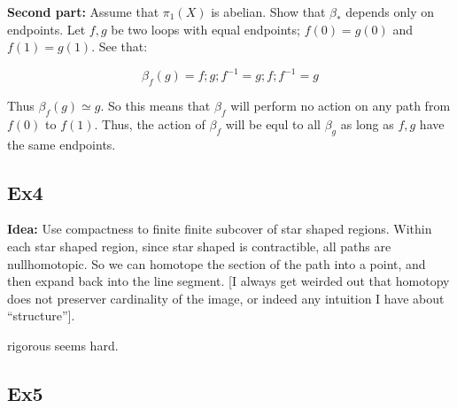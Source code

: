 \documentclass[11pt]{book}
\newcommand*{\start}[1]{\leavevmode\newline \textbf{#1} }
\begin{document}
\start{Second part:} Assume that $\pi_1(X)$ is abelian. Show that $\beta_*$ depends only on endpoints. Let $f, g$ be two
loops with equal endpoints; $f(0) = g(0)$ and $f(1) = g(1)$. See that:

$$
\beta_f(g) = f; g; f^{-1} = g; f; f^{-1} = g
$$

Thus $\beta_f(g) \simeq g$. So this means that $\beta_f$ will perform no action on any path from $f(0)$ to $f(1)$.
Thus, the action of $\beta_f$ will be equl to all $\beta_g$ as long as $f, g$ have the same endpoints.

\subsection{Ex4}
\start{Idea:} Use compactness to finite finite subcover of star shaped regions. Within each star shaped region,
since star shaped is contractible, all paths are nullhomotopic. So we can homotope the section of the path into a point, and then expand
back into the line segment. [I always get weirded out that homotopy does not preserver cardinality of the image, or indeed any intuition I have about
``structure''].


rigorous seems hard.

\subsection{Ex5}
\end{document}
